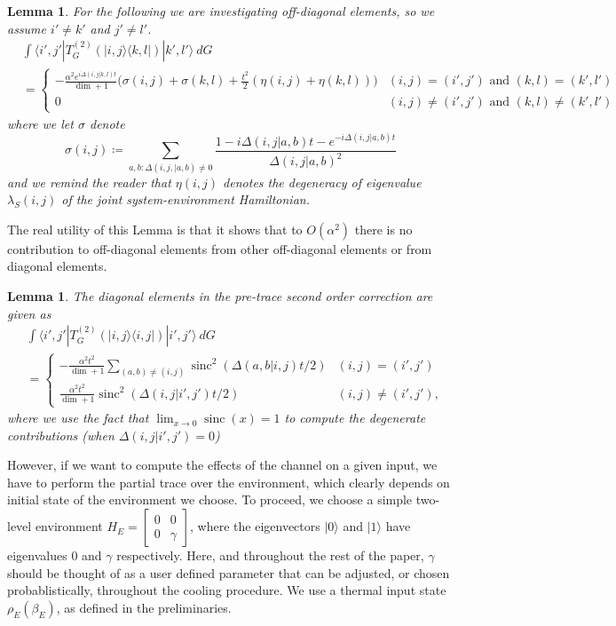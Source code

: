 \documentclass{article}
\newtheorem{lemma}[theorem]{Lemma}
\newcommand{\ket}[1]{|#1\rangle}
\newcommand{\bra}[1]{\langle #1|}
\newcommand{\ketbra}[2]{| #1\rangle\! \langle #2|}
\DeclareMathOperator{\sinc}{sinc}
\begin{document}
\begin{lemma}
     For the following we are investigating off-diagonal elements, so we assume $i' \neq k'$ and $j' \neq l'$.
    \begin{align}
    &\int \bra{i', j'}  T^{(2)}_G \left( \ketbra{i, j}{k, l} \right) \ket{k', l'} ~dG \\
    &=\begin{cases}
        -\frac{\alpha^2 e^{i \Delta(i,j|k,l) t}}{\dim + 1} \bigg( \sigma(i,j) + \sigma(k,l) + \frac{t^2}{2}(\eta(i,j) + \eta(k,l)) \bigg) & (i, j) = (i', j') \text{ and } (k, l) = (k', l') \\
        0 & (i, j) \neq (i', j') \text{ and } (k, l) \neq (k', l')
    \end{cases}
    \end{align}
    where we let $\sigma$ denote
    \begin{equation}
        \sigma(i,j) \coloneqq \sum_{a,b: \Delta(i,j,|a,b) \neq 0} \frac{1 - i \Delta(i,j|a,b)t - e^{-i \Delta(i,j|a,b) t}}{\Delta(i,j|a,b)^2}
    \end{equation}
    and we remind the reader that $\eta(i,j)$ denotes the degeneracy of eigenvalue $\lambda_S(i,j)$ of the joint system-environment Hamiltonian. 
\end{lemma}
The real utility of this Lemma is that it shows that to $O(\alpha^2)$ there is no contribution to off-diagonal elements from other off-diagonal elements or from diagonal elements.
\begin{lemma} \label{lem:t_2_both}
    The diagonal elements in the pre-trace second order correction are given as
    \begin{align}
        &\int \bra{i', j'} T^{(2)}_G \left( \ketbra{i, j}{i, j} \right) \ket{i', j'} ~dG \\
        &= \begin{cases}
            - \frac{\alpha^2 t^2 }{\dim + 1} \sum_{(a,b) \neq (i, j)} \sinc^2(\Delta(a,b|i,j) t / 2) & (i,j) = (i', j') \\
    \frac{\alpha^2 t^2 }{\dim + 1} \sinc^2(\Delta(i,j | i', j') t /2) & (i, j) \neq (i', j'),
        \end{cases} \label{eq:second_order_transitions_final_final}
    \end{align}
    where we use the fact that $\lim_{x \to 0} \sinc(x) = 1$ to compute the degenerate contributions (when $\Delta(i, j | i', j') = 0$)
\end{lemma}
However, if we want to compute the effects of the channel on a given input, we have to perform the partial trace over the environment, which clearly depends on initial state of the environment we choose. To proceed, we choose a simple two-level environment $H_E = \begin{bmatrix}
    0 & 0 \\ 0 & \gamma
\end{bmatrix}$, where the eigenvectors $\ket{0}$ and $\ket{1}$ have eigenvalues 0 and $\gamma$ respectively. Here, and throughout the rest of the paper, $\gamma$ should be thought of as a user defined parameter that can be adjusted, or chosen probablistically, throughout the cooling procedure. We use a thermal input state $\rho_E(\beta_E)$, as defined in the preliminaries. 
\end{document}
